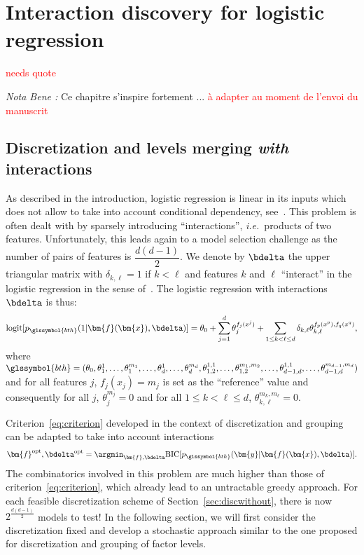 \chapter{Interaction discovery for logistic regression} \label{chap5}

\textcolor{red}{needs quote}

\textit{Nota Bene :} Ce chapitre s'inspire fortement ... \textcolor{red}{à adapter au moment de l'envoi du manuscrit}


\section{Discretization and levels merging \textit{with} interactions} \label{sec:discwith}

As described in the introduction, logistic regression is linear in its inputs which does not allow to take into account conditional dependency, see~\cite{berry2010testing}. This problem is often dealt with by sparsely introducing ``interactions'', \textit{i.e.}\ products of two features. Unfortunately, this leads again to a model selection challenge as the number of pairs of features is $\dfrac{d(d-1)}{2}$. We denote by $\bdelta$ the upper triangular matrix with $\delta_{k,\ell} = 1$ if $k < \ell$ and features $k$ and $\ell$ ``interact'' in the logistic regression in the sense of~\cite{berry2010testing}. The logistic regression with interactions $\bdelta$ is thus:
\begin{equation} \label{eq:reglog_sans}
\text{logit}[p_{\glssymbol{bth}}(1|\bm{f}(\bm{x}),\bdelta)] = \theta_{0} + \sum_{j=1}^d \theta_{j}^{f_j(x^j)} + \sum_{1 \leq k < \ell \leq d} \delta_{k,\ell} \theta_{k,\ell}^{f_p(x^p),f_q(x^q)},
\end{equation}
where $\glssymbol{bth} = (\theta_{0},\theta_{1}^1,\dots,\theta_{1}^{m_1},\dots,\theta_{d}^1,\dots,\theta_{d}^{m_d},\theta_{1,2}^{1,1},\dots,\theta_{1,2}^{m_1,m_2},\dots,\theta_{d-1,d}^{1,1},\dots,\theta_{d-1,d}^{m_{d-1},m_d})$ and for all features $j$, $f_j(x_j)=m_j$ is set as the ``reference'' value and consequently for all $j$, $\theta_{j}^{m_j}=0$ and for all $1 \leq k < \ell \leq d$, $\theta_{k,\ell}^{m_k,m_{\ell}}=0$.

Criterion~\eqref{eq:criterion} developed in the context of discretization and grouping can be adapted to take into account interactions
\begin{equation}\label{eq:criterion_inter}
\bm{f}^{\text{opt}},\bdelta^{\text{opt}} = \argmin_{\bm{f},\bdelta} \text{BIC}[p_{\glssymbol{bth}}(\bm{y}|\bm{f}(\bm{x}),\bdelta)].
\end{equation}
The combinatorics involved in this problem are much higher than those of criterion~\eqref{eq:criterion}, which already lead to an untractable greedy approach. For each feasible discretization scheme of Section~\ref{sec:discwithout}, there is now $2^{\frac{d(d-1)}{2}}$ models to test! In the following section, we will first consider the discretization fixed and develop a stochastic approach similar to the one proposed for discretization and grouping of factor levels.

